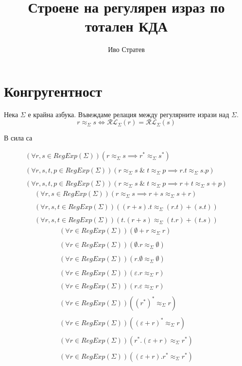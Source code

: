 \documentclass[12pt]{article}
\title{Строене на регулярен израз по тотален КДА}
\author{Иво Стратев}
\begin{document}
\maketitle

\section{Конгругентност}

Нека \(\Sigma\) е крайна азбука. Въвеждаме релация между регулярните изрази над \(\Sigma\).
\[r \approx_\Sigma s \iff \mathcal{RL}_\Sigma(r) = \mathcal{RL}_\Sigma(s)\]

В сила са 

\begin{align*}
    (\forall r, s \in RegExp(\Sigma))(r \approx_\Sigma s \implies r^* \approx_\Sigma s^*) \\\\
    (\forall r, s, t, p \in RegExp(\Sigma))(r \approx_\Sigma s \;\&\; t \approx_\Sigma p \implies r . t \approx_\Sigma s . p) \\\\
    (\forall r, s, t, p \in RegExp(\Sigma))(r \approx_\Sigma s \;\&\; t \approx_\Sigma p \implies r + t \approx_\Sigma s + p)
\end{align*}
\begin{align*}
    (\forall r, s \in RegExp(\Sigma))(r \approx_\Sigma s \implies r + s \approx_\Sigma s + r) \\\\
    (\forall r, s, t \in RegExp(\Sigma))((r + s).t \approx_\Sigma (r.t) + (s.t)) \\\\
    (\forall r, s, t \in RegExp(\Sigma))(t.(r + s) \approx_\Sigma (t.r) + (t.s))
\end{align*}
\begin{align*}
    (\forall r \in RegExp(\Sigma))(\emptyset + r \approx_\Sigma r) \\\\
    (\forall r \in RegExp(\Sigma))(\emptyset . r \approx_\Sigma \emptyset) \\\\
    (\forall r \in RegExp(\Sigma))(r . \emptyset \approx_\Sigma \emptyset) \\\\
    (\forall r \in RegExp(\Sigma))(\varepsilon . r \approx_\Sigma r) \\\\
    (\forall r \in RegExp(\Sigma))(r . \varepsilon \approx_\Sigma r) \\\\
    (\forall r \in RegExp(\Sigma))((r^*)^*\approx_\Sigma r) \\\\
    (\forall r \in RegExp(\Sigma))((\varepsilon + r)^* \approx_\Sigma r) \\\\
    (\forall r \in RegExp(\Sigma))(r^* . (\varepsilon + r) \approx_\Sigma r^*) \\\\
    (\forall r \in RegExp(\Sigma))((\varepsilon + r) . r^* \approx_\Sigma r^*)
\end{align*}
\end{document}
